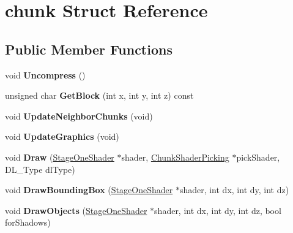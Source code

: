 \hypertarget{structchunk}{\section{chunk \-Struct \-Reference}
\label{structchunk}
}
\subsection*{\-Public \-Member \-Functions}
\begin{DoxyCompactItemize}
\item 
\hypertarget{structchunk_aa7d70d12dfd888f887376ab8dd516b4a}{void {\bfseries \-Uncompress} ()}\label{structchunk_aa7d70d12dfd888f887376ab8dd516b4a}

\item 
\hypertarget{structchunk_a2fd060379e1b7ed20a89660d8fff6c48}{unsigned char {\bfseries \-Get\-Block} (int x, int y, int z) const }\label{structchunk_a2fd060379e1b7ed20a89660d8fff6c48}

\item 
\hypertarget{structchunk_ae1746d5e4644e9cf802ded9556b13d79}{void {\bfseries \-Update\-Neighbor\-Chunks} (void)}\label{structchunk_ae1746d5e4644e9cf802ded9556b13d79}

\item 
\hypertarget{structchunk_ad7cae7413346d48d9efafce21413db46}{void {\bfseries \-Update\-Graphics} (void)}\label{structchunk_ad7cae7413346d48d9efafce21413db46}

\item 
\hypertarget{structchunk_a7595dfb7789020670f912e5471806f05}{void {\bfseries \-Draw} (\hyperlink{classStageOneShader}{\-Stage\-One\-Shader} $\ast$shader, \hyperlink{classChunkShaderPicking}{\-Chunk\-Shader\-Picking} $\ast$pick\-Shader, \-D\-L\-\_\-\-Type dl\-Type)}\label{structchunk_a7595dfb7789020670f912e5471806f05}

\item 
\hypertarget{structchunk_a0ee86d88bb46da9128c598c5288a79c1}{void {\bfseries \-Draw\-Bounding\-Box} (\hyperlink{classStageOneShader}{\-Stage\-One\-Shader} $\ast$shader, int dx, int dy, int dz)}\label{structchunk_a0ee86d88bb46da9128c598c5288a79c1}

\item 
\hypertarget{structchunk_a8da673d2d9e4e59d254c41a83c990bec}{void {\bfseries \-Draw\-Objects} (\hyperlink{classStageOneShader}{\-Stage\-One\-Shader} $\ast$shader, int dx, int dy, int dz, bool for\-Shadows)}\label{structchunk_a8da673d2d9e4e59d254c41a83c990bec}


\end{DoxyCompactItemize}
